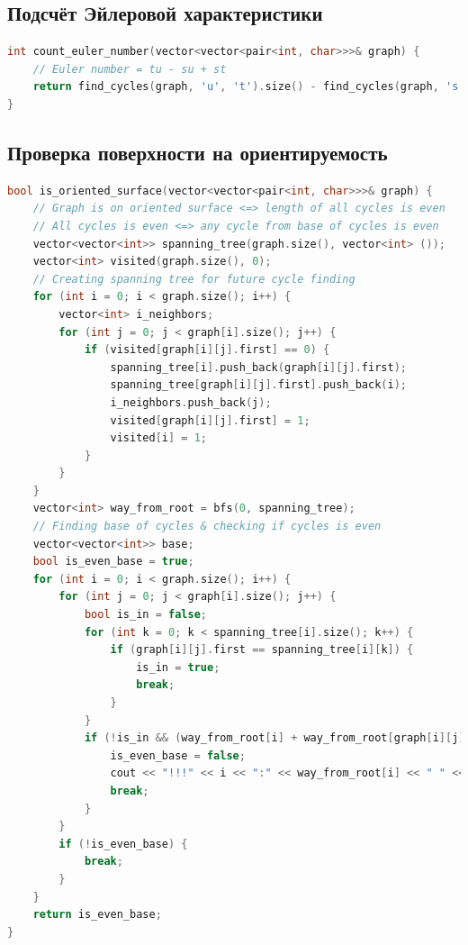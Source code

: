 \subsection{Подсчёт Эйлеровой характеристики}
\begin{lstlisting}[language=C++]
int count_euler_number(vector<vector<pair<int, char>>>& graph) {
	// Euler number = tu - su + st
	return find_cycles(graph, 'u', 't').size() - find_cycles(graph, 's', 'u').size() + find_cycles(graph, 's', 't').size();
}
\end{lstlisting}
\subsection{Проверка поверхности на ориентируемость}
\begin{lstlisting}[language=C++]
bool is_oriented_surface(vector<vector<pair<int, char>>>& graph) {
	// Graph is on oriented surface <=> length of all cycles is even
	// All cycles is even <=> any cycle from base of cycles is even
	vector<vector<int>> spanning_tree(graph.size(), vector<int> ());
	vector<int> visited(graph.size(), 0);
	// Creating spanning tree for future cycle finding
	for (int i = 0; i < graph.size(); i++) {
		vector<int> i_neighbors;
		for (int j = 0; j < graph[i].size(); j++) {
			if (visited[graph[i][j].first] == 0) {
				spanning_tree[i].push_back(graph[i][j].first);
				spanning_tree[graph[i][j].first].push_back(i);
				i_neighbors.push_back(j);
				visited[graph[i][j].first] = 1;
				visited[i] = 1;
			}
		}
	}
	vector<int> way_from_root = bfs(0, spanning_tree);
	// Finding base of cycles & checking if cycles is even
	vector<vector<int>> base;
	bool is_even_base = true;
	for (int i = 0; i < graph.size(); i++) {
		for (int j = 0; j < graph[i].size(); j++) {
			bool is_in = false;
			for (int k = 0; k < spanning_tree[i].size(); k++) {
				if (graph[i][j].first == spanning_tree[i][k]) {
					is_in = true;
					break;
				}
			}
			if (!is_in && (way_from_root[i] + way_from_root[graph[i][j].first] + 1) % 2 == 1) {
				is_even_base = false;
				cout << "!!!" << i << ":" << way_from_root[i] << " " << graph[i][j].first << ":" << way_from_root[graph[i][j].first] << "!!!";
				break;
			}
		}
		if (!is_even_base) {
			break;
		}
	}
	return is_even_base;
}
\end{lstlisting}
